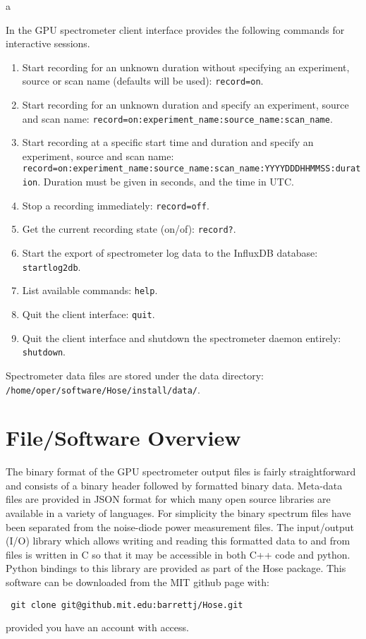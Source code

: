 a\documentclass[a4paper,14pt]{article}
\begin{document}
In the GPU spectrometer client interface provides the following commands for interactive sessions.
\begin{enumerate}
 \item Start recording for an unknown duration without specifying an experiment, source or scan name (defaults will be used): \verb|record=on|.
 \item Start recording for an unknown duration and specify an experiment, source and scan name: \verb|record=on:experiment_name:source_name:scan_name|.
 \item Start recording at a specific start time and duration and specify an experiment, source and scan name: \verb|record=on:experiment_name:source_name:scan_name:YYYYDDDHHMMSS:duration|. Duration must be given in seconds, and the time in UTC.
 \item Stop a recording immediately: \verb|record=off|.
 \item Get the current recording state (on/of): \verb|record?|.
 \item Start the export of spectrometer log data to the InfluxDB database: \verb|startlog2db|.
 \item List available commands: \verb|help|.
 \item Quit the client interface: \verb|quit|.
 \item Quit the client interface and shutdown the spectrometer daemon entirely: \verb|shutdown|.
\end{enumerate}
Spectrometer data files are stored under the data directory: \verb|/home/oper/software/Hose/install/data/|.

\section{File/Software Overview}

The binary format of the GPU spectrometer output files is fairly straightforward and consists of a binary header followed by formatted binary data. Meta-data files
are provided in JSON format for which many open source libraries are available in a variety of languages. For simplicity the binary
spectrum files have been separated from the noise-diode power measurement files. The input/output (I/O) library which allows writing 
and reading this formatted data to and from files is written in C so that it may be accessible in both C++ code and python. Python bindings to this
library are provided as part of the Hose package. This software can be downloaded from the MIT github page with:
\begin{lstlisting}
 git clone git@github.mit.edu:barrettj/Hose.git
\end{lstlisting}
provided you have an account with access.
\end{document}
